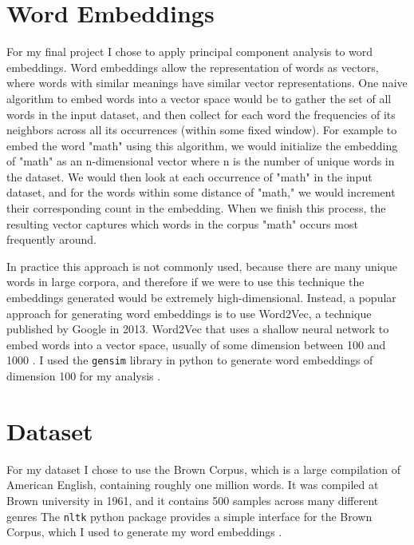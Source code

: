 \documentclass[12pt,letterpaper]{article}
\begin{document}
\section{Word Embeddings}
For my final project I chose to apply principal component analysis to word embeddings.
Word embeddings allow the representation of words as vectors, where words with similar meanings have similar vector representations. 
One naive algorithm to embed words into a vector space would be to gather the set of all words in the input dataset, and then collect for each word the frequencies of its neighbors across all its occurrences (within some fixed window).
For example to embed the word "math" using this algorithm, we would initialize the embedding of "math" as an n-dimensional vector where n is the number of unique words in the dataset. 
We would then look at each occurrence of "math" in the input dataset, and for the words within some distance of "math," we would increment their corresponding count in the embedding. 
When we finish this process, the resulting vector captures which words in the corpus "math" occurs most frequently around.

In practice this approach is not commonly used, because there are many unique words in large corpora, and therefore if we were to use this technique the embeddings generated would be extremely high-dimensional. 
Instead, a popular approach for generating word embeddings is to use Word2Vec, a technique published by Google in 2013. 
Word2Vec that uses a shallow neural network to embed words into a vector space, usually of some dimension between 100 and 1000 \cite{word2vec}.
I used the \texttt{gensim} library in python to generate word embeddings of dimension 100 for my analysis \cite{gensim}.
\section{Dataset}
For my dataset I chose to use the Brown Corpus, which is a large compilation of American English, containing roughly one million words. It was compiled at Brown university in 1961, and it contains 500 samples across many different genres \cite{brown}
The \texttt{nltk} python package provides a simple interface for the Brown Corpus, which I used to generate my word embeddings \cite{nltk}.
\end{document}

